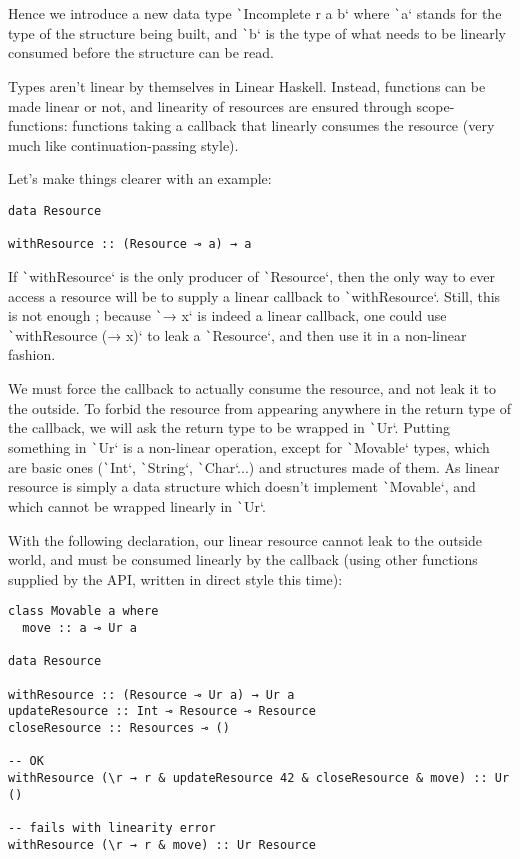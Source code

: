 \documentclass[english]{jflart}
\begin{document}
Hence we introduce a new data type \texttt`Incomplete r a b` where \texttt`a` stands for the type of the structure being built, and \texttt`b` is the type of what needs to be linearly consumed before the structure can be read.

Types aren't linear by themselves in Linear Haskell. Instead, functions can be made linear or not, and linearity of resources are ensured through scope-functions: functions taking a callback that linearly consumes the resource (very much like continuation-passing style).

Let's make things clearer with an example:
\begin{verbatim}
data Resource

withResource :: (Resource ⊸ a) → a
\end{verbatim}

If \texttt`withResource` is the only producer of \texttt`Resource`, then the only way to ever access a resource will be to supply a linear callback to \texttt`withResource`. Still, this is not enough ; because \texttt`\x → x` is indeed a linear callback, one could use \texttt`withResource (\x → x)` to leak a \texttt`Resource`, and then use it in a non-linear fashion.

We must force the callback to actually consume the resource, and not leak it to the outside. To forbid the resource from appearing anywhere in the return type of the callback, we will ask the return type to be wrapped in \texttt`Ur`. Putting something in \texttt`Ur` is a non-linear operation, except for \texttt`Movable` types, which are basic ones (\texttt`Int`, \texttt`String`, \texttt`Char`...) and structures made of them. As linear resource is simply a data structure which doesn't implement \texttt`Movable`, and which cannot be wrapped linearly in \texttt`Ur`.

With the following declaration, our linear resource cannot leak to the outside world, and must be consumed linearly by the callback (using other functions supplied by the API, written in direct style this time):

\begin{verbatim}
class Movable a where
  move :: a ⊸ Ur a

data Resource

withResource :: (Resource ⊸ Ur a) → Ur a
updateResource :: Int ⊸ Resource ⊸ Resource
closeResource :: Resources ⊸ ()

-- OK
withResource (\r → r & updateResource 42 & closeResource & move) :: Ur ()

-- fails with linearity error
withResource (\r → r & move) :: Ur Resource
\end{verbatim}
\end{document}
